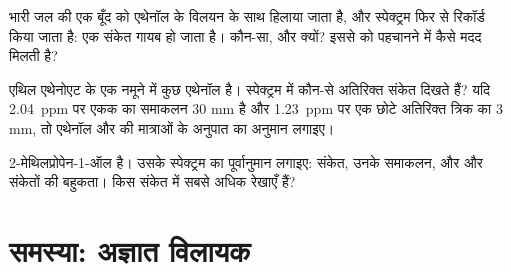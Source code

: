\begin{exercise}[$\star\star\star$]\label{exo:g12:proton-nmr:13}
भारी जल  की एक बूँद को एथेनॉल के विलयन के साथ हिलाया जाता है, और
स्पेक्ट्रम फिर से रिकॉर्ड किया जाता है: एक संकेत गायब हो जाता है। कौन-सा, और क्यों?
इससे   को पहचानने में कैसे मदद मिलती है?
\end{exercise}

\begin{exercise}[$\star\star\star$]\label{exo:g12:proton-nmr:14}
एथिल एथेनोएट के एक नमूने में कुछ एथेनॉल है। स्पेक्ट्रम में कौन-से अतिरिक्त
संकेत दिखते हैं? यदि \qty{2.04}{ppm} पर एकक का समाकलन
30 mm है और \qty{1.23}{ppm} पर एक छोटे अतिरिक्त त्रिक का 3 mm, तो एथेनॉल और
 की मात्राओं के अनुपात का अनुमान लगाइए।
\end{exercise}

\begin{exercise}[$\star\star\star$]\label{exo:g12:proton-nmr:15}
2-मेथिलप्रोपेन-1-ऑल  है। उसके स्पेक्ट्रम का पूर्वानुमान लगाइए:
संकेत, उनके समाकलन, और  और
 संकेतों की बहुकता। किस संकेत में सबसे अधिक रेखाएँ हैं?
\end{exercise}

\section{समस्या: अज्ञात विलायक}

